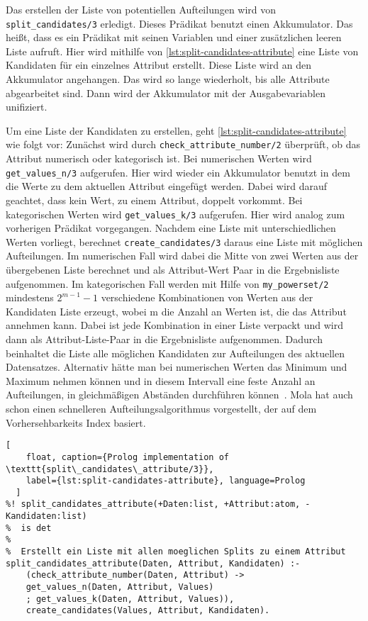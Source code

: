 Das erstellen der Liste von potentiellen Aufteilungen wird von \texttt{split\_candidates/3} erledigt.
Dieses Prädikat benutzt einen Akkumulator. Das heißt, dass es ein Prädikat mit seinen
Variablen und einer zusätzlichen leeren Liste aufruft. Hier wird mithilfe von \cref{lst:split-candidates-attribute}
eine Liste von Kandidaten für ein einzelnes Attribut erstellt. Diese Liste wird
an den Akkumulator angehangen. Das wird so lange wiederholt, bis alle Attribute abgearbeitet sind.
Dann wird der Akkumulator mit der Ausgabevariablen unifiziert.

Um eine Liste der Kandidaten zu erstellen, geht \cref{lst:split-candidates-attribute} wie folgt vor:
Zunächst wird durch \texttt{check\_attribute\_number/2} überprüft, ob das Attribut numerisch oder kategorisch ist.
Bei numerischen Werten wird \texttt{get\_values\_n/3} aufgerufen.
Hier wird wieder ein Akkumulator benutzt in dem die Werte zu dem aktuellen Attribut eingefügt werden.
Dabei wird darauf geachtet, dass kein Wert, zu einem Attribut, doppelt vorkommt.
Bei kategorischen Werten wird \texttt{get\_values\_k/3} aufgerufen. Hier wird analog
zum vorherigen Prädikat vorgegangen.
Nachdem eine Liste mit unterschiedlichen Werten vorliegt, berechnet \texttt{create\_candidates/3} daraus eine Liste mit möglichen Aufteilungen.
Im numerischen Fall wird dabei die Mitte von zwei Werten aus der übergebenen Liste berechnet und als
Attribut-Wert Paar in die Ergebnisliste aufgenommen. Im kategorischen Fall werden mit Hilfe von \texttt{my\_powerset/2}
mindestens \(2^{m-1} - 1\) verschiedene Kombinationen von Werten aus der Kandidaten Liste erzeugt, wobei m die Anzahl an Werten ist,
die das Attribut annehmen kann.
Dabei ist jede Kombination in einer Liste verpackt und wird dann als Attribut-Liste-Paar
in die Ergebnisliste aufgenommen.
Dadurch beinhaltet die Liste alle möglichen Kandidaten zur Aufteilungen des aktuellen Datensatzes.
Alternativ hätte man bei numerischen Werten das Minimum und Maximum nehmen können und in diesem Intervall
eine feste Anzahl an Aufteilungen, in gleichmäßigen Abständen durchführen können~\cite{breiman1984classification}.
Mola \cite{MOLA1997} hat auch schon einen schnelleren Aufteilungsalgorithmus vorgestellt, der auf dem Vorhersehbarkeits
Index basiert.

\begin{lstlisting}[
    float, caption={Prolog implementation of \texttt{split\_candidates\_attribute/3}},
    label={lst:split-candidates-attribute}, language=Prolog
  ]
%! split_candidates_attribute(+Daten:list, +Attribut:atom, -Kandidaten:list)
%  is det
%
%  Erstellt ein Liste mit allen moeglichen Splits zu einem Attribut
split_candidates_attribute(Daten, Attribut, Kandidaten) :-
    (check_attribute_number(Daten, Attribut) -> 
    get_values_n(Daten, Attribut, Values)
    ; get_values_k(Daten, Attribut, Values)),
    create_candidates(Values, Attribut, Kandidaten).
\end{lstlisting}


